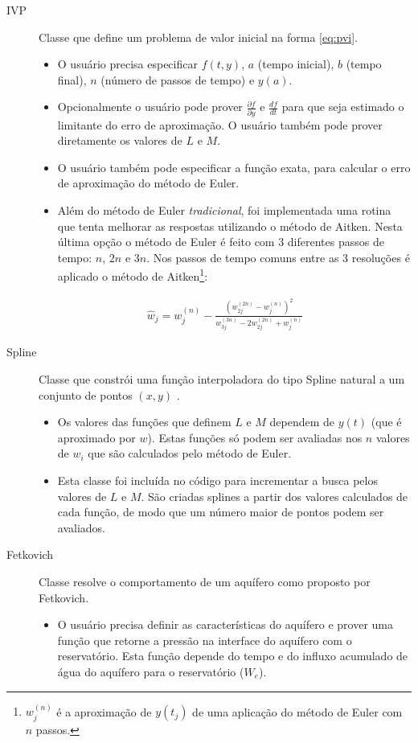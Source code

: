 \documentclass[final,5p]{elsarticle}
\numberwithin{equation}{section}
\begin{document}
        \begin{description}
            \item[IVP] Classe que define um problema de valor inicial na forma \ref{eq:pvi}.
            \begin{itemize}
                \item O usuário precisa especificar $f(t,y)$, $a$ (tempo inicial), $b$ (tempo final), $n$ (número de passos de tempo) e $y(a)$.
                \item Opcionalmente o usuário pode prover $\frac{\partial f}{\partial y}$ e $\frac{df}{dt}$ para que seja estimado o limitante do erro de aproximação. O usuário também pode prover diretamente os valores de $L$ e $M$.
                \item O usuário também pode especificar a função exata, para calcular o erro de aproximação do método de Euler.
                \item Além do método de Euler \emph{tradicional}, foi implementada uma rotina que tenta melhorar as respostas utilizando o método de Aitken. Nesta última opção o método de Euler é feito com 3 diferentes passos de tempo: $n$, $2 n$ e $3 n$. Nos passos de tempo comuns entre as 3 resoluções é aplicado o método de Aitken\footnote{$w^{(n)}_j$ é a aproximação de $y(t_j)$ de uma aplicação do método de Euler com $n$ passos.}:
            \end{itemize}

                \begin{align}
                    \widehat{w}_j = w^{(n)}_j - \frac{\left(w^{(2n)}_{2j} - w^{(n)}_j\right) ^2}{w^{(3n)}_{3j}-2w^{(2n)}_{2j}+w^{(n)}_j} \label{eq:aitken}
                \end{align}

            \item[Spline] Classe que constrói uma função interpoladora do tipo Spline natural a um conjunto de pontos $(x,y)$ \cite{relatoriosplinesnaturais}.
            \begin{itemize}
                \item Os valores das funções que definem $L$ e $M$ dependem de $y(t)$ (que é aproximado por $w$). Estas funções só podem ser avaliadas nos $n$ valores de $w_i$ que são calculados pelo método de Euler.
                \item Esta classe foi incluída no código para incrementar a busca pelos valores de $L$ e $M$. São criadas splines a partir dos valores calculados de cada função, de modo que um número maior de pontos podem ser avaliados.
            \end{itemize}
            \item[Fetkovich] Classe resolve o comportamento de um aquífero como proposto por Fetkovich.
            \begin{itemize}
                \item O usuário precisa definir as características do aquífero e prover uma função que retorne a pressão na interface do aquífero com o reservatório. Esta função depende do tempo e do influxo acumulado de água do aquífero para o reservatório ($W_e$).
            \end{itemize}
        \end{description}
\end{document}
